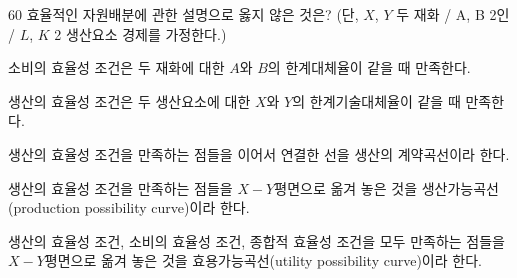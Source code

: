 \begin{question}{60}
효율적인 자원배분에 관한 설명으로 옳지 않은 것은? (단, $X$, $Y$ 두 재화 / A, B 2인 / $L$, $K$ 2 생산요소 경제를 가정한다.)
\begin{choices}
  \item 소비의 효율성 조건은 두 재화에 대한 $A$와 $B$의 한계대체율이 같을 때 만족한다.
  \item 생산의 효율성 조건은 두 생산요소에 대한 $X$와 $Y$의 한계기술대체율이 같을 때 만족한다.
  \item 생산의 효율성 조건을 만족하는 점들을 이어서 연결한 선을 생산의 계약곡선이라 한다.
  \item 생산의 효율성 조건을 만족하는 점들을 $X-Y$평면으로 옮겨 놓은 것을 생산가능곡선(production possibility curve)이라 한다.
  \item 생산의 효율성 조건, 소비의 효율성 조건, 종합적 효율성 조건을 모두 만족하는 점들을 $X-Y$평면으로 옮겨 놓은 것을 효용가능곡선(utility possibility curve)이라 한다.
\end{choices}
\end{question}
